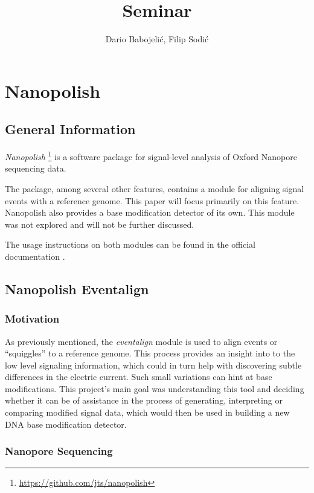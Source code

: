 \documentclass[times, utf, seminar]{fer}
\title{Seminar}
\author{Dario Babojelić, Filip Sodić}
\begin{document}
\maketitle
\tableofcontents
\newpage

\chapter{Nanopolish}

\section{General Information}
\emph{Nanopolish}
\footnote{\url{https://github.com/jts/nanopolish}}
is a software package for signal-level analysis of Oxford Nanopore sequencing data.


The package, among several other features, contains a module for aligning signal events with a reference genome. This paper will focus primarily on this feature. Nanopolish also provides a base modification detector of its own. This module was not explored and will not be further discussed.

The usage instructions on both modules can be found in the official documentation \citep{nanopolish}.

\section{Nanopolish Eventalign}

\subsection{Motivation}
As previously mentioned, the \emph{eventalign} module is used to align events or “squiggles” to a reference genome. This process provides an insight into to the low
level signaling information, which could in turn help with discovering subtle differences in
the electric current. Such small variations can hint at base modifications. This project's main goal was understanding this tool and deciding whether it can be of assistance in the process of generating, interpreting or comparing modified signal data, which would then be used in building a new DNA base modification detector.

\subsection{Nanopore Sequencing}\label{sequencing}
\end{document}
